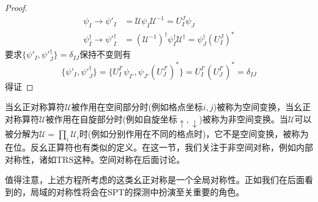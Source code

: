 \documentclass[a4paper]{article}
\numberwithin{equation}{subsection}
\newtheorem{proof}{证明}
\begin{document}
\begin{proof}
    \begin{equation}
        \begin{split}
            \psi_I\rightarrow\psi'_I&=\mathcal{U}\psi_I\mathcal{U}^{-1}=U_I^J\psi_J\\
            \psi_I^\dagger\rightarrow{\psi'}_I^\dagger&=(\mathcal{U}^{-1})^\dagger\psi_I^\dagger\mathcal{U}^\dagger=\psi_J^\dagger(U^{J}_{I})^*
        \end{split}
    \end{equation}
    要求$\{\psi'_I,{\psi'}_J^\dagger\}=\delta_{IJ}$保持不变则有
    \begin{equation}
        \{\psi'_I,{\psi'}_J^\dagger\}=\{U_I^{I'}\psi_{I'},\psi_{J'}(U_J^{J'})^*\}=U_I^{I'}(U_J^{I'})^*=\delta_{IJ}
    \end{equation}
    得证
\end{proof}
当幺正对称算符$\mathcal{U}$被作用在空间部分时(例如格点坐标$i,j$)被称为空间变换，当幺正对称算符$\mathcal{U}$被作用在自旋部分时(例如自旋坐标$\uparrow,\downarrow$)被称为非空间变换。当$\mathcal{U}$可以被分解为$\mathcal{U}=\prod_{i}\mathcal{U}_i$时(例如分别作用在不同的格点时)，它不是空间变换，被称为在位。反幺正算符也有类似的定义。在这一节，我们关注于非空间对称，例如内部对称性，诸如TRS这种。空间对称在后面讨论。

值得注意，上述方程所考虑的这类幺正对称是一个全局对称性。正如我们在后面看到的，局域的对称性将会在SPT的探测中扮演至关重要的角色。
\end{document}
